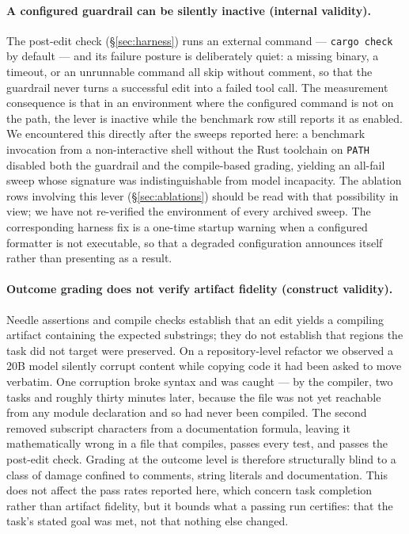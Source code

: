 \documentclass[smallcondensed,natbib]{svjour3}
\begin{document}
\paragraph{A configured guardrail can be silently inactive (internal
validity).} The post-edit check (\S\ref{sec:harness}) runs an external
command --- \texttt{cargo check} by default --- and its failure posture
is deliberately quiet: a missing binary, a timeout, or an unrunnable
command all skip without comment, so that the guardrail never turns a
successful edit into a failed tool call. The measurement consequence is
that in an environment where the configured command is not on the
path, the lever is inactive while the benchmark row still reports it as
enabled. We encountered this directly after the sweeps reported here:
a benchmark invocation from a non-interactive shell without the Rust
toolchain on \texttt{PATH} disabled both the guardrail and the
compile-based grading, yielding an all-fail sweep whose signature was
indistinguishable from model incapacity. The ablation rows involving
this lever (\S\ref{sec:ablations}) should be read with that
possibility in view; we have not re-verified the environment of every
archived sweep. The corresponding harness fix is a one-time startup
warning when a configured formatter is not executable, so that a
degraded configuration announces itself rather than presenting as a
result.

\paragraph{Outcome grading does not verify artifact fidelity
(construct validity).} Needle assertions and compile checks establish
that an edit yields a compiling artifact containing the expected
substrings; they do not establish that regions the task did not target
were preserved. On a repository-level refactor we observed a 20B model
silently corrupt content while copying code it had been asked to move
verbatim. One corruption broke syntax and was caught --- by the
compiler, two tasks and roughly thirty minutes later, because the file
was not yet reachable from any module declaration and so had never
been compiled. The second removed subscript characters from a
documentation formula, leaving it mathematically wrong in a file that
compiles, passes every test, and passes the post-edit check. Grading
at the outcome level is therefore structurally blind to a class of
damage confined to comments, string literals and documentation. This
does not affect the pass rates reported here, which concern task
completion rather than artifact fidelity, but it bounds what a passing
run certifies: that the task's stated goal was met, not that nothing
else changed.
\end{document}
